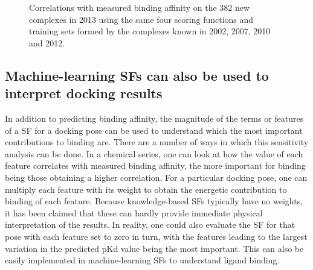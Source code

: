\begin{figure}
\centering
{}
\caption{Correlations with measured binding affinity on the 382 new complexes in 2013 using the same four scoring functions and training sets formed by the complexes known in 2002, 2007, 2010 and 2012.}
\label{rfscore3:partitions2345RsRp}
\end{figure}

\subsection{Machine-learning SFs can also be used to interpret docking results}

In addition to predicting binding affinity, the magnitude of the terms or features of a SF for a docking pose can be used to understand which the most important contributions to binding are. There are a number of ways in which this sensitivity analysis can be done. In a chemical series, one can look at how the value of each feature correlates with measured binding affinity, the more important for binding being those obtaining a higher correlation. For a particular docking pose, one can multiply each feature with its weight to obtain the energetic contribution to binding of each feature. Because knowledge-based SFs typically have no weights, it has been claimed \citep{1372} that these can hardly provide immediate physical interpretation of the results. In reality, one could also evaluate the SF for that pose with each feature set to zero in turn, with the features leading to the largest variation in the predicted pKd value being the most important. This can also be easily implemented in machine-learning SFs to understand ligand binding.

